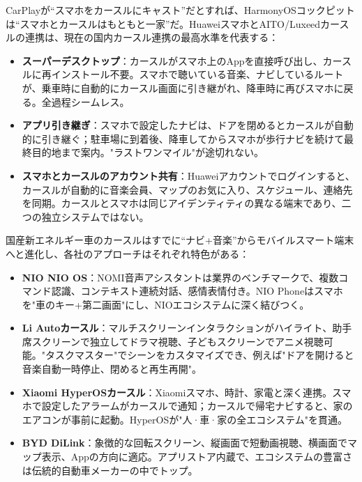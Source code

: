 
CarPlayが“スマホをカースルにキャスト”だとすれば、HarmonyOSコックピットは“スマホとカースルはもともと一家”だ。HuaweiスマホとAITO/Luxeedカースルの連携は、現在の国内カースル連携の最高水準を代表する：

\begin{itemize}
  \item \textbf{スーパーデスクトップ}：カースルがスマホ上のAppを直接呼び出し、カースルに再インストール不要。スマホで聴いている音楽、ナビしているルートが、乗車時に自動的にカースル画面に引き継がれ、降車時に再びスマホに戻る。全過程シームレス。
  \item \textbf{アプリ引き継ぎ}：スマホで設定したナビは、ドアを閉めるとカースルが自動的に引き継ぐ；駐車場に到着後、降車してからスマホが歩行ナビを続けて最終目的地まで案内。"ラストワンマイル"が途切れない。
  \item \textbf{スマホとカースルのアカウント共有}：Huaweiアカウントでログインすると、カースルが自動的に音楽会員、マップのお気に入り、スケジュール、連絡先を同期。カースルとスマホは同じアイデンティティの異なる端末であり、二つの独立システムではない。
\end{itemize}


国産新エネルギー車のカースルはすでに“ナビ+音楽”からモバイルスマート端末へと進化し、各社のアプローチはそれぞれ特色がある：

\begin{itemize}
  \item \textbf{NIO NIO OS}：NOMI音声アシスタントは業界のベンチマークで、複数コマンド認識、コンテキスト連続対話、感情表情付き。NIO Phoneはスマホを"車のキー+第二画面"にし、NIOエコシステムに深く結びつく。
  \item \textbf{Li Autoカースル}：マルチスクリーンインタラクションがハイライト、助手席スクリーンで独立してドラマ視聴、子どもスクリーンでアニメ視聴可能。"タスクマスター"でシーンをカスタマイズでき、例えば"ドアを開けると音楽自動一時停止、閉めると再生再開"。
  \item \textbf{Xiaomi HyperOSカースル}：Xiaomiスマホ、時計、家電と深く連携。スマホで設定したアラームがカースルで通知；カースルで帰宅ナビすると、家のエアコンが事前に起動。HyperOSが"人·車·家の全エコシステム"を貫通。
  \item \textbf{BYD DiLink}：象徴的な回転スクリーン、縦画面で短動画視聴、横画面でマップ表示、Appの方向に適応。アプリストア内蔵で、エコシステムの豊富さは伝統的自動車メーカーの中でトップ。
\end{itemize}

